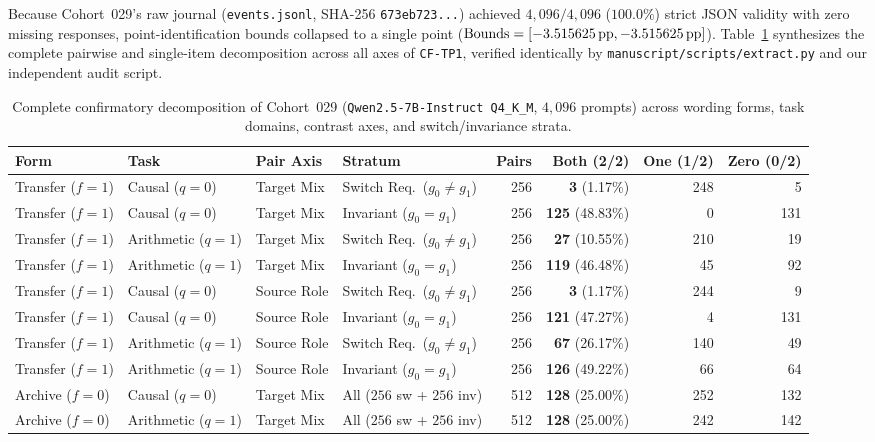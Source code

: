 Because Cohort~029's raw journal (\texttt{events.jsonl}, SHA-256 \texttt{673eb723...}) achieved $4{,}096/4{,}096$ ($100.0\%$) strict JSON validity with zero missing responses, point-identification bounds collapsed to a single point ($\mathrm{Bounds} = [-3.515625\,\mathrm{pp}, -3.515625\,\mathrm{pp}]$). Table~\ref{tab:c29_full_breakdown} synthesizes the complete pairwise and single-item decomposition across all axes of \texttt{CF-TP1}, verified identically by \texttt{manuscript/scripts/extract.py} and our independent audit script.

\begin{table}[htbp]
\centering
\footnotesize
\caption{Complete confirmatory decomposition of Cohort~029 (\texttt{Qwen2.5-7B-Instruct Q4\_K\_M}, $4{,}096$ prompts) across wording forms, task domains, contrast axes, and switch/invariance strata.}\label{tab:c29_full_breakdown}
\begin{tabular}{@{}llllrrrr@{}}
\toprule
\textbf{Form} & \textbf{Task} & \textbf{Pair Axis} & \textbf{Stratum} & \textbf{Pairs} & \textbf{Both (2/2)} & \textbf{One (1/2)} & \textbf{Zero (0/2)} \\
\midrule
Transfer ($f=1$) & Causal ($q=0$)     & Target Mix  & Switch Req.\ ($g_0\neq g_1$) & 256 & \textbf{3} (1.17\%)   & 248 & 5 \\
Transfer ($f=1$) & Causal ($q=0$)     & Target Mix  & Invariant ($g_0=g_1$)        & 256 & \textbf{125} (48.83\%) & 0   & 131 \\
Transfer ($f=1$) & Arithmetic ($q=1$) & Target Mix  & Switch Req.\ ($g_0\neq g_1$) & 256 & \textbf{27} (10.55\%)  & 210 & 19 \\
Transfer ($f=1$) & Arithmetic ($q=1$) & Target Mix  & Invariant ($g_0=g_1$)        & 256 & \textbf{119} (46.48\%) & 45  & 92 \\
\midrule
Transfer ($f=1$) & Causal ($q=0$)     & Source Role & Switch Req.\ ($g_0\neq g_1$) & 256 & \textbf{3} (1.17\%)   & 244 & 9 \\
Transfer ($f=1$) & Causal ($q=0$)     & Source Role & Invariant ($g_0=g_1$)        & 256 & \textbf{121} (47.27\%) & 4   & 131 \\
Transfer ($f=1$) & Arithmetic ($q=1$) & Source Role & Switch Req.\ ($g_0\neq g_1$) & 256 & \textbf{67} (26.17\%)  & 140 & 49 \\
Transfer ($f=1$) & Arithmetic ($q=1$) & Source Role & Invariant ($g_0=g_1$)        & 256 & \textbf{126} (49.22\%) & 66  & 64 \\
\midrule
Archive ($f=0$)  & Causal ($q=0$)     & Target Mix  & All ($256$ sw + $256$ inv)   & 512 & \textbf{128} (25.00\%) & 252 & 132 \\
Archive ($f=0$)  & Arithmetic ($q=1$) & Target Mix  & All ($256$ sw + $256$ inv)   & 512 & \textbf{128} (25.00\%) & 242 & 142 \\
\bottomrule
\end{tabular}
\end{table}

